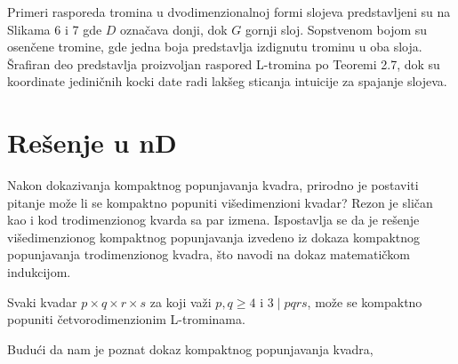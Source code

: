 Primeri rasporeda tromina u dvodimenzionalnoj formi slojeva predstavljeni su na Slikama 6 i 7 gde $D$ označava donji, dok $G$ gornji sloj. Sopstvenom bojom su osenčene tromine, gde jedna boja predstavlja izdignutu trominu u oba sloja. Šrafiran deo predstavlja proizvoljan raspored L-tromina po Teoremi 2.7, dok su koordinate jediničnih kocki date radi lakšeg sticanja intuicije za spajanje slojeva.




\section{Rešenje u nD}

Nakon dokazivanja kompaktnog popunjavanja kvadra, prirodno je postaviti pitanje može li se kompaktno popuniti višedimenzioni kvadar? Rezon je sličan kao i kod trodimenzionog kvarda sa par izmena. Ispostavlja se da je rešenje višedimenzionog kompaktnog popunjavanja izvedeno iz dokaza kompaktnog popunjavanja trodimenzionog kvadra, što navodi na dokaz matematičkom indukcijom.


\begin{Theorem}
    Svaki kvadar $p\times q\times r\times s$ za koji važi $p,q \geq 4$ i $3\mid pqrs$, može se kompaktno popuniti četvorodimenzionim L-trominama.
\end{Theorem}
Budući da nam je poznat dokaz kompaktnog popunjavanja kvadra,


